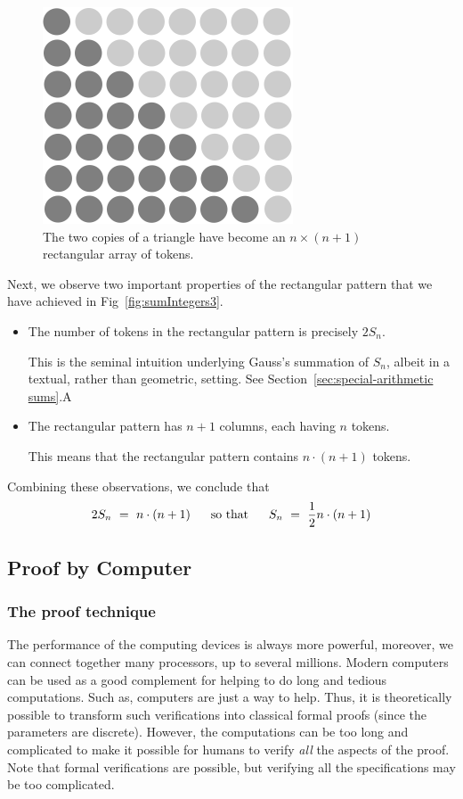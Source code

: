 \begin{figure}[ht]
\begin{center}
       \includegraphics[scale=0.4]{FiguresMaths/SumIntegersFinal}
\caption{The two copies of a triangle have become an $n \times (n+1)$
  rectangular array of tokens.}
       \label{fig:sumIntegerss3}
\end{center}
\end{figure}
Next, we observe two important properties of the rectangular pattern
that we have achieved in Fig~\ref{fig:sumIntegers3}.
\begin{itemize}
\item
The number of tokens in the rectangular pattern is precisely $2 S_n$.

This is the seminal intuition underlying Gauss's summation of $S_n$,
albeit in a textual, rather than geometric, setting.  See
Section~\ref{sec:special-arithmetic sums}.A

\item
The rectangular pattern has $n+1$ columns, each having $n$ tokens.

This means that the rectangular pattern contains $n \cdot (n+1)$
tokens.
\end{itemize}
Combining these observations, we conclude that
\[ 2 S_n \ = \ n \cdot (n+1) \ \ \ \ \mbox{ so that } \ \ \ \
S_n \ = \ {1 \over 2} n \cdot (n+1)
\]


\subsection{Proof by Computer}


\subsubsection{The proof technique}

The performance of the computing devices is always more powerful,
moreover, we can connect together many processors, up to several millions.
Modern computers can be used as a good complement for helping to do long and tedious computations. 
Such as, computers are just a way to help. 
Thus, it is theoretically possible to transform such verifications into classical formal proofs (since the parameters are discrete).
However, the computations can be too long and complicated to make it possible for humans to verify \textit{all} the aspects of the proof.
Note that formal verifications are possible, but verifying all the specifications may be too complicated. 


